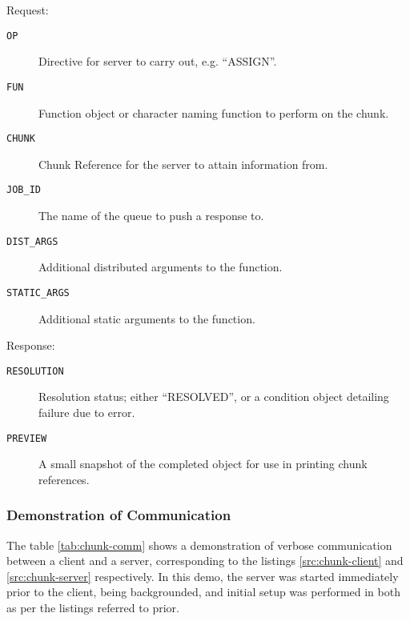 Request:
\begin{description}
	\item[\texttt{OP}] Directive for server to carry out, e.g. ``ASSIGN''.
	\item[\texttt{FUN}] Function object or character naming function to
		perform on the chunk.
	\item[\texttt{CHUNK}] Chunk Reference for the server to attain
		information from.
	\item[\texttt{JOB\_ID}] The name of the queue to push a response to.
	\item[\texttt{DIST\_ARGS}] Additional distributed arguments to the
		function.
	\item[\texttt{STATIC\_ARGS}] Additional static arguments to the
		function.
\end{description}

Response:
\begin{description}
	\item[\texttt{RESOLUTION}] Resolution status; either ``RESOLVED'', or a
		condition object detailing failure due to error.
	\item[\texttt{PREVIEW}]  A small snapshot of the completed object for
		use in printing chunk references.
\end{description}

\subsubsection{Demonstration of Communication}

The table \cref{tab:chunk-comm} shows a demonstration of verbose communication
between a client and a server, corresponding to the listings
\cref{src:chunk-client} and \cref{src:chunk-server} respectively.
In this demo, the server was started immediately prior to the client, being
backgrounded, and initial setup was performed in both as per the listings
referred to prior.

